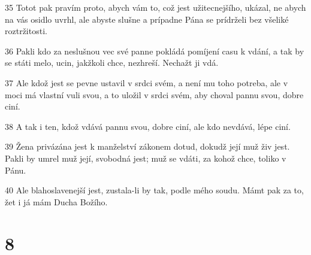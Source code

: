 \par 35 Totot pak pravím proto, abych vám to, což jest užitecnejšího, ukázal, ne abych na vás osidlo uvrhl, ale abyste slušne a prípadne Pána se prídrželi bez všeliké roztržitosti.
\par 36 Pakli kdo za neslušnou vec své panne pokládá pomíjení casu k vdání, a tak by se státi melo, ucin, jakžkoli chce, nezhreší. Nechažt ji vdá.
\par 37 Ale kdož jest se pevne ustavil v srdci svém, a není mu toho potreba, ale v moci má vlastní vuli svou, a to uložil v srdci svém, aby choval pannu svou, dobre ciní.
\par 38 A tak i ten, kdož vdává pannu svou, dobre ciní, ale kdo nevdává, lépe ciní.
\par 39 Žena privázána jest k manželství zákonem dotud, dokudž její muž živ jest. Pakli by umrel muž její, svobodná jest; muž se vdáti, za kohož chce, toliko v Pánu.
\par 40 Ale blahoslavenejší jest, zustala-li by tak, podle mého soudu. Mámt pak za to, žet i já mám Ducha Božího.

\chapter{8}

